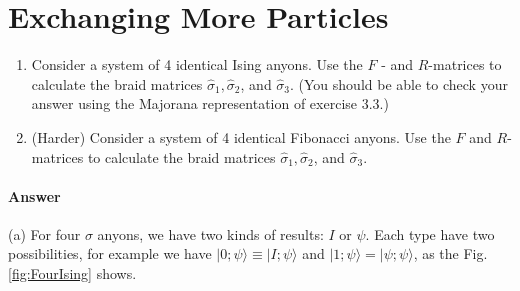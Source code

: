 \section{Exchanging More Particles}

\begin{enumerate}
\item Consider a system of 4 identical Ising anyons. Use the $F$ - and $R$-matrices to calculate the braid matrices $\hat{\sigma }_{1} ,\hat{\sigma }_{2}$, and $\hat{\sigma }_{3}$. (You should be able to check your answer using the Majorana representation of exercise 3.3.)
\item (Harder) Consider a system of 4 identical Fibonacci anyons. Use the $F$ and $R$-matrices to calculate the braid matrices $\hat{\sigma }_{1} ,\hat{\sigma }_{2}$, and $\hat{\sigma }_{3}$.
\end{enumerate}

\paragraph{Answer}
(a) For four $\sigma $ anyons, we have two kinds of results: $I$ or $\psi $. Each type have two possibilities, for example we have $|0;\psi \rangle \equiv |I;\psi \rangle $ and $|1;\psi \rangle =|\psi ;\psi \rangle $, as the Fig.\ref{fig:FourIsing} shows.

